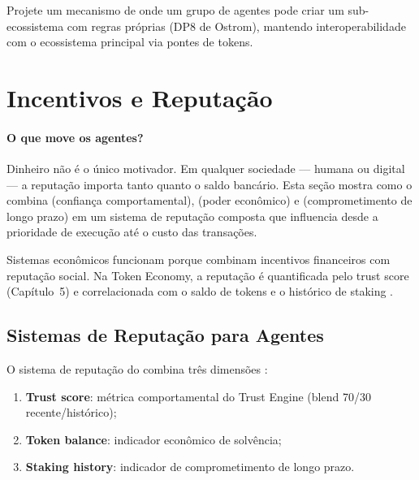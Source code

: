 \begin{exercicio}
Projete um mecanismo de  onde um grupo de
agentes pode criar um sub-ecossistema com regras próprias (DP8
de Ostrom), mantendo interoperabilidade com o ecossistema
principal via pontes de tokens.
\end{exercicio}

\section{Incentivos e Reputação}
\label{sec:incentivos-reputacao}
\nivelavancado

\paragraph{O que move os agentes?} Dinheiro não é o único motivador. Em qualquer sociedade --- humana ou digital --- a reputação importa tanto quanto o saldo bancário. Esta seção mostra como o \opencodeeco{} combina  (confiança comportamental),  (poder econômico) e  (comprometimento de longo prazo) em um sistema de reputação composta que influencia desde a prioridade de execução até o custo das transações.

Sistemas econômicos funcionam porque combinam incentivos
financeiros com reputação social. Na Token Economy, a reputação
é quantificada pelo trust score (Capítulo~5) e correlacionada
com o saldo de tokens e o histórico de staking
\cite{opencode2026token, opencode2026spec038}.

\subsection{Sistemas de Reputação para Agentes}

O sistema de reputação do \opencodeeco{} combina três dimensões
\cite{opencode2026token, opencode2026ecosystem}:

\begin{enumerate}
\item \textbf{Trust score}: métrica comportamental do Trust
Engine (blend 70/30 recente/histórico);
\item \textbf{Token balance}: indicador econômico de solvência;
\item \textbf{Staking history}: indicador de comprometimento
de longo prazo.
\end{enumerate}

